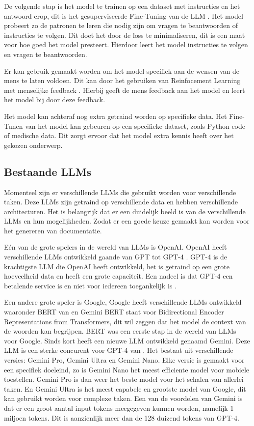 De volgende stap is het model te trainen op een dataset met instructies en het antwoord erop, dit is het gesuperviseerde Fine-Tuning van de LLM \autocite{Das2024}. 
Het model probeert zo de patronen te leren die nodig zijn om vragen te beantwoorden of instructies te volgen.
Dit doet het door de loss te minimaliseren, dit is een maat voor hoe goed het model presteert.
Hierdoor leert het model instructies te volgen en vragen te beantwoorden.

Er kan gebruik gemaakt worden om het model specifiek aan de wensen van de mens te laten voldoen. Dit kan door het gebruiken van Reinfocement Learning met menselijke feedback \autocite{LambertEtAL2022}. 
Hierbij geeft de mens feedback aan het model en leert het model bij door deze feedback.

Het model kan achteraf nog extra getraind worden op specifieke data. 
Het Fine-Tunen van het model kan gebeuren op een specifieke dataset, zoals Python code of medische data.
Dit zorgt ervoor dat het model extra kennis heeft over het gekozen onderwerp.

\subsection{Bestaande LLMs}
\label{sec:bestaande-llms}

Momenteel zijn er verschillende LLMs die gebruikt worden voor verschillende taken.
Deze LLMs zijn getraind op verschillende data en hebben verschillende architecturen.
Het is belangrijk dat er een duidelijk beeld is van de verschillende LLMs en hun mogelijkheden. 
Zodat er een goede keuze gemaakt kan worden voor het genereren van documentatie.

Eén van de grote spelers in de wereld van LLMs is OpenAI. OpenAI heeft verschillende LLMs ontwikkeld gaande van GPT \autocite{RandfordEtAL2018} tot GPT-4 \autocite{OpenAI2023}.
GPT-4 is de krachtigste LLM die OpenAI heeft ontwikkeld, het is getraind op een grote hoeveelheid data en heeft een grote capaciteit.
Een nadeel is dat GPT-4 een betalende service is en niet voor iedereen toegankelijk is \autocite{OpenAI2023}.

Een andere grote speler is Google, Google heeft verschillende LLMs ontwikkeld waaronder BERT van \textcite{DevlinEtAl2019} en Gemini \autocite{Google2024}
BERT staat voor Bidirectional Encoder Representations from Transformers, dit wil zeggen dat het model de context van de woorden kan begrijpen.
BERT was een eerste stap in de wereld van LLMs voor Google. Sinds kort heeft \textcite{Google2024} een nieuwe LLM ontwikkeld genaamd Gemini.
Deze LLM is een sterke concurent voor GPT-4 van \textcite{OpenAI2023}. Het bestaat uit verschillende versies: Gemini Pro, Gemini Ultra en Gemini Nano. 
Elke versie is gemaakt voor een specifiek doeleind, zo is Gemini Nano het meest efficiente model voor mobiele toestellen. Gemini Pro is dan weer het beste model voor het schalen van allerlei taken.
En Gemini Ultra is het meest capabele en grootste model van Google, dit kan gebruikt worden voor complexe taken.
Een van de voordelen van Gemini is dat er een groot aantal input tokens meegegeven kunnen worden, namelijk 1 miljoen tokens.
Dit is aanzienlijk meer dan de 128 duizend tokens van GPT-4.

